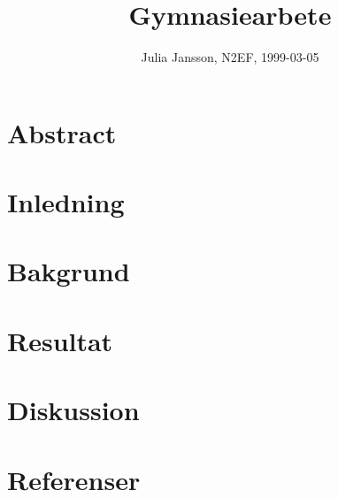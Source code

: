 \documentclass[a4paper, titlepage]{article}
\title{Gymnasiearbete}
\author{Julia Jansson, N2EF, 1999-03-05}
\begin{document}
\maketitle

\tableofcontents

\section{Abstract}
\section{Inledning}
\section{Bakgrund}
\section{Resultat}
\section{Diskussion}
\section{Referenser}
\end{document}
